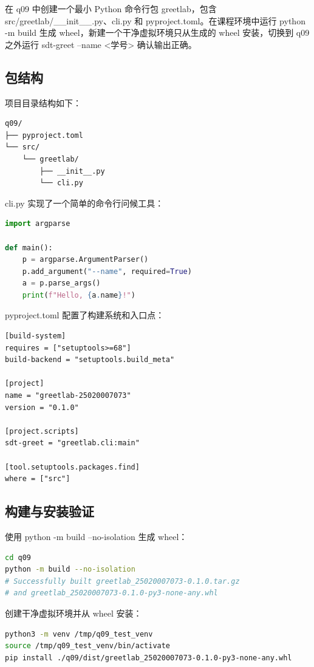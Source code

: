 \documentclass[UTF8]{ctexart}
\begin{document}
在 q09 中创建一个最小 Python 命令行包 greetlab，包含 src/greetlab/\_\_init\_\_.py、cli.py 和 pyproject.toml。在课程环境中运行 python -m build 生成 wheel，新建一个干净虚拟环境只从生成的 wheel 安装，切换到 q09 之外运行 sdt-greet --name <学号> 确认输出正确。

\subsection{包结构}

项目目录结构如下：

\begin{verbatim}
q09/
├── pyproject.toml
└── src/
    └── greetlab/
        ├── __init__.py
        └── cli.py
\end{verbatim}

cli.py 实现了一个简单的命令行问候工具：

\begin{lstlisting}[language=Python]
import argparse

def main():
    p = argparse.ArgumentParser()
    p.add_argument("--name", required=True)
    a = p.parse_args()
    print(f"Hello, {a.name}!")
\end{lstlisting}

pyproject.toml 配置了构建系统和入口点：

\begin{lstlisting}
[build-system]
requires = ["setuptools>=68"]
build-backend = "setuptools.build_meta"

[project]
name = "greetlab-25020007073"
version = "0.1.0"

[project.scripts]
sdt-greet = "greetlab.cli:main"

[tool.setuptools.packages.find]
where = ["src"]
\end{lstlisting}

\subsection{构建与安装验证}

使用 python -m build --no-isolation 生成 wheel：

\begin{lstlisting}[language=bash]
cd q09
python -m build --no-isolation
# Successfully built greetlab_25020007073-0.1.0.tar.gz
# and greetlab_25020007073-0.1.0-py3-none-any.whl
\end{lstlisting}

创建干净虚拟环境并从 wheel 安装：

\begin{lstlisting}[language=bash]
python3 -m venv /tmp/q09_test_venv
source /tmp/q09_test_venv/bin/activate
pip install ./q09/dist/greetlab_25020007073-0.1.0-py3-none-any.whl
\end{lstlisting}
\end{document}

